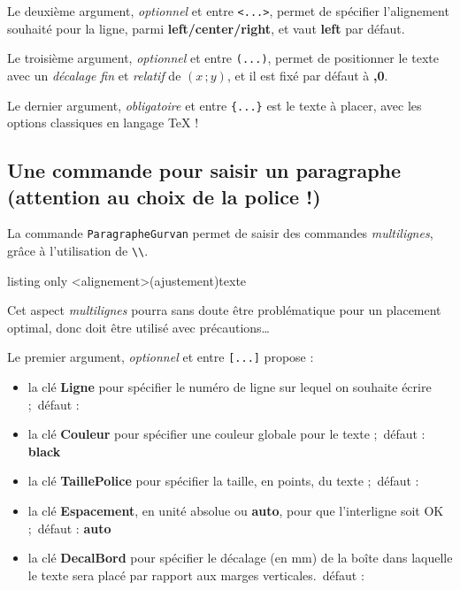 \documentclass[a4paper]{article}
\newcommand\Cle[1]{{\bfseries\sffamily\textlangle #1\textrangle}}
\begin{document}
Le deuxième argument, \textit{optionnel} et entre \texttt{<...>}, permet de spécifier l'alignement souhaité pour la ligne, parmi \Cle{left/center/right}, et vaut \Cle{left} par défaut.

\smallskip

Le troisième argument, \textit{optionnel} et entre \texttt{(...)}, permet de positionner le texte avec un \textit{décalage fin} et \textit{relatif} de $(x\,;y)$, et il est fixé par défaut à \Cle{0,0}.

\smallskip

Le dernier argument, \textit{obligatoire} et entre \texttt{\{...\}} est le texte à placer, avec les options classiques en langage \TeX{} !

\pagebreak

\subsection{Une commande pour saisir un paragraphe (attention au choix de la police !)}

La commande \texttt{ParagrapheGurvan} permet de saisir des commandes \textit{multilignes}, grâce à l'utilisation de \texttt{\textbackslash\textbackslash}.

\begin{PresentationCode}{listing only}
\ParagrapheGurvan[options]<alignement>(ajustement){texte}
\end{PresentationCode}

\faBomb{} Cet aspect \textit{multilignes} pourra sans doute être problématique pour un placement optimal, donc doit être utilisé avec précautions\ldots

\smallskip

Le premier argument, \textit{optionnel} et entre \texttt{[...]} propose :

\begin{itemize}
	\item la clé \Cle{Ligne} pour spécifier le numéro de ligne sur lequel on souhaite écrire ;\hfill~défaut : \Cle{1}
	\item la clé \Cle{Couleur} pour spécifier une couleur globale pour le texte ;\hfill~défaut : \Cle{black}
	\item la clé \Cle{TaillePolice} pour spécifier la taille, en points, du texte ;\hfill~défaut : \Cle{1}
	\item la clé \Cle{Espacement}, en unité absolue ou \Cle{auto}, pour que l'interligne soit OK ;\hfill~défaut : \Cle{auto}
	\item la clé \Cle{DecalBord} pour spécifier le décalage (en mm) de la boîte dans laquelle le texte sera placé par rapport aux marges verticales.\hfill~défaut : \Cle{0}
\end{itemize}
\end{document}
